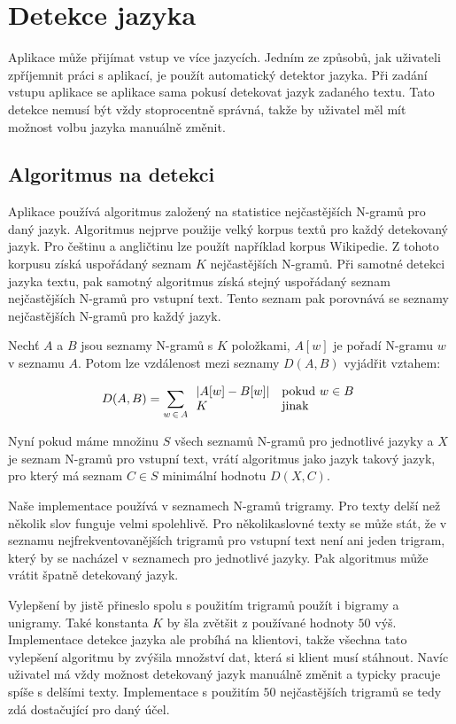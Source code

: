 \chapter{Detekce jazyka}

Aplikace může přijímat vstup ve více jazycích. Jedním ze způsobů, jak uživateli zpříjemnit práci s aplikací, je použít automatický detektor jazyka. Při zadání vstupu aplikace se aplikace sama pokusí detekovat jazyk zadaného textu. Tato detekce nemusí být vždy stoprocentně správná, takže by uživatel měl mít možnost volbu jazyka manuálně změnit.

\section{Algoritmus na detekci}

Aplikace používá algoritmus založený na statistice nejčastějších N-gramů pro daný jazyk\cite{cavnar1994n}. Algoritmus nejprve použije velký korpus textů pro každý detekovaný jazyk. Pro češtinu a angličtinu lze použít například korpus Wikipedie. Z tohoto korpusu získá uspořádaný seznam $K$ nejčastějších N-gramů. Při samotné detekci jazyka textu, pak samotný algoritmus získá stejný uspořádaný seznam nejčastějších N-gramů pro vstupní text. Tento seznam pak porovnává se seznamy nejčastějších N-gramů pro každý jazyk.

Nechť $A$ a $B$ jsou seznamy N-gramů s $K$ položkami, $A[w]$ je pořadí N-gramu $w$ v seznamu $A$. Potom lze vzdálenost mezi seznamy $D(A,B)$ vyjádřit vztahem:

\begin{equation}
  D(A, B) = \sum_{w\,\in\,A} \begin{array}{l l} |A[w] - B[w]| & \mathrm{pokud}\ w \in B \\
  K & \mathrm{jinak} \end{array}
\end{equation}

Nyní pokud máme množinu $S$ všech seznamů N-gramů pro jednotlivé jazyky a $X$ je seznam N-gramů pro vstupní text, vrátí algoritmus jako jazyk takový jazyk, pro který má seznam $C \in S$ minimální hodnotu $D(X, C)$.

Naše implementace používá v seznamech N-gramů trigramy. Pro texty delší než několik slov funguje velmi spolehlivě. Pro několikaslovné texty se může stát, že v seznamu nejfrekventovanějších trigramů pro vstupní text není ani jeden trigram, který by se nacházel v seznamech pro jednotlivé jazyky. Pak algoritmus může vrátit špatně detekovaný jazyk.

Vylepšení by jistě přineslo spolu s použitím trigramů použít i bigramy a unigramy. Také konstanta $K$ by šla zvětšit z používané hodnoty $50$ výš. Implementace detekce jazyka ale probíhá na klientovi, takže všechna tato vylepšení algoritmu by zvýšila množství dat, která si klient musí stáhnout. Navíc uživatel má vždy možnost detekovaný jazyk manuálně změnit a typicky pracuje spíše s delšími texty. Implementace s použitím $50$ nejčastějších trigramů se tedy zdá dostačující pro daný účel.